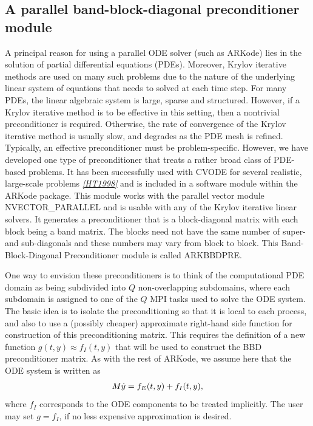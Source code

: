 \documentclass[letterpaper,10pt,english]{sphinxmanual}
\begin{document}
\subsection{A parallel band-block-diagonal preconditioner module}
\label{c_interface/Preconditioners:cinterface-bbdpre}\label{c_interface/Preconditioners:a-parallel-band-block-diagonal-preconditioner-module}
A principal reason for using a parallel ODE solver (such as ARKode)
lies in the solution of partial differential equations
(PDEs). Moreover, Krylov iterative methods are used on many such
problems due to the nature of the underlying linear system of
equations that needs to solved at each time step.  For many PDEs, the
linear algebraic system is large, sparse and structured.  However, if
a Krylov iterative method is to be effective in this setting, then a
nontrivial preconditioner is required.  Otherwise, the rate of
convergence of the Krylov iterative method is usually slow, and
degrades as the PDE mesh is refined.  Typically, an effective
preconditioner must be problem-specific.  However, we have developed
one type of preconditioner that treats a rather broad class of
PDE-based problems.  It has been successfully used with CVODE for
several realistic, large-scale problems \label{c_interface/Preconditioners:id1}{\hyperref[References:ht1998]{\emph{{[}HT1998{]}}}} and is included
in a software module within the ARKode package.  This module works
with the parallel vector module NVECTOR\_PARALLEL and is usable
with any of the Krylov iterative linear solvers. It generates a
preconditioner that is a block-diagonal matrix with each block being a
band matrix. The blocks need not have the same number of super- and
sub-diagonals and these numbers may vary from block to block. This
Band-Block-Diagonal Preconditioner module is called ARKBBDPRE.

One way to envision these preconditioners is to think of the
computational PDE domain as being subdivided into \(Q\)
non-overlapping subdomains, where each subdomain is assigned to one of
the \(Q\) MPI tasks used to solve the ODE system.  The basic idea
is to isolate the preconditioning so that it is local to each process,
and also to use a (possibly cheaper) approximate right-hand side
function for construction of this preconditioning matrix.  This
requires the definition of a new function \(g(t,y) \approx
f_I(t,y)\) that will be used to construct the BBD preconditioner
matrix.  As with the rest of ARKode, we assume here that the ODE
system is written as
\begin{gather}
\begin{split}M\dot{y} = f_E(t,y) + f_I(t,y),\end{split}\notag
\end{gather}
where \(f_I\) corresponds to the ODE components to be treated
implicitly.  The user may set \(g = f_I\), if no less expensive
approximation is desired.
\end{document}
